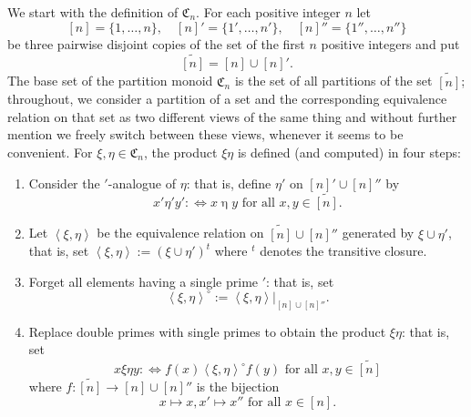 \documentclass[11pt,reqno]{amsart}
\numberwithin{equation}{section}
\theoremstyle{remark}
\def\C{\mathfrak{C}}
\begin{document}
We start with the definition of $\C_n$. For each positive integer
$n$ let
$$[n]=\{1,\dots,n\},\quad [n]'=\{1',\dots,n'\},\quad [n]''=\{1'',\dots,n''\}$$
be three pairwise disjoint copies of the set of the first $n$
positive integers and put
$$\widetilde{[n]}=[n]\cup [n]'.$$
The base set of the partition monoid $\C_n$ is the set of all
partitions of the set $\widetilde{[n]}$; throughout, we consider a
partition of a set and the corresponding equivalence relation on
that set as two different views of the same thing and without
further mention we freely switch between these views, whenever it
seems to be convenient. For $\xi,\eta\in \C_n$, the product
$\xi\eta$ is defined (and computed) in four steps:
\begin{enumerate}
\item Consider the $'$-analogue of $\eta$: that is, define $\eta'$
on ${[n]'}\cup {[n]''}$ by
$${x'}\mathrel{\eta'}{y'}:\Leftrightarrow x\mathrel{\eta}
y\text{ for all } x,y\in \widetilde{[n]}.$$
\item Let $\left<\xi,\eta\right>$ be the equivalence relation on
$\widetilde{[n]}\cup {[n]''}$ generated by $\xi\cup {\eta'}$, that
is, set $\left<\xi,\eta\right>:=(\xi\cup {\eta'})^t$ where $^t$
denotes the transitive closure.
\item Forget all elements having a single prime $'$: that is, set
$$\left<\xi,\eta\right>^\circ:=\left<\xi,\eta\right>|_{[n]\cup{[n]''}}.$$
\item Replace  double primes with single primes to
obtain the product $\xi\eta$: that is, set
$$x\mathrel{\xi\eta}y:\Leftrightarrow f(x)\mathrel{\left<\xi,\eta\right>^\circ}f(y)
\text{ for all }x,y\in \widetilde{[n]}$$ where
$f:\widetilde{[n]}\to [n]\cup{[n]''}$ is the bijection
$$x\mapsto x, x'\mapsto x'' \text{ for all } x\in [n].$$
\end{enumerate}
\end{document}
